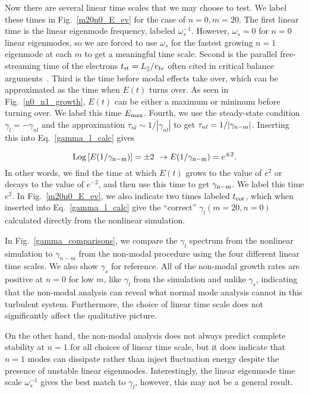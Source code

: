 \documentclass[letter,scriptaddress,twocolumn, prl,showkeys]{revtex4}
\def\beq{\begin{equation}}
\def\eeq{\end{equation}}
\def\para{\parallel}
\begin{document}
Now there are several linear time scales that we may choose to test. We label these times in Fig.~\ref{m20n0_E_ev}
for the case of $n=0, m=20$. The first linear time is the linear eigenmode frequency, labeled
$\omega_s^{-1}$. However, $\omega_s = 0$ for $n=0$ linear eigenmodes, so we are forced to use $\omega_s$ for the fastest growing $n=1$ eigenmode at each $m$ to get a meaningful time scale.
Second is the parallel free-streaming time of the electrons $t_{\rm{st}} = L_\para/v_{t e}$ often cited in critical balance arguments~\cite{barnes2011}. Third is the time before modal effects
take over, which can be approximated as the time when $E(t)$ turns over. As seen in Fig.~\ref{n0_n1_growth}, $E(t)$ can be either a maximum or minimum before turning over. 
We label this time $E_{\rm{max}}$. 
Fourth, we use the steady-state condition $\gamma_l = - \gamma_{nl}$ and the approximation $\tau_{nl} \sim 1/|\gamma_{nl}|$ to get $\tau_{nl} = 1/|\gamma_{\rm{n-m}}|$. 
Inserting this into Eq.~\ref{gamma_l_calc} gives

\beq
\label{fourth_gamma_cond}
 {\rm{Log}} \left[ E(1/\gamma_{\rm{n-m}})\right] = \pm 2 \ \rightarrow E(1/\gamma_{\rm{n-m}}) = e^{\pm 2}.
\eeq
In other words, we find the time at which $E(t)$ grows to the value of $e^2$ or decays to the value of $e^{-2}$, and then use this time to get $\gamma_{\rm{n-m}}$. We label this time $e^2$. 
In Fig.~\ref{m20n0_E_ev},
we also indicate two times labeled $t_{\rm{cor}}$, which when inserted into Eq.~\ref{gamma_l_calc} give the ``correct'' $\gamma_l(m=20,n=0)$ calculated directly from the nonlinear simulation.

In Fig.~\ref{gamma_comparisons}, we compare the $\gamma_{l}$ spectrum from the nonlinear simulation to $\gamma_{n-m}$ from the non-modal procedure using the four different linear time scales. We also show
$\gamma_s$ for reference. All of the non-modal growth rates are positive at $n=0$ for low $m$, like $\gamma_l$ from the simulation and unlike $\gamma_s$, indicating that the non-modal analysis can reveal
what normal mode analysis cannot in this turbulent system. Furthermore, the choice of linear time scale does not significantly affect the qualitative picture. 

On the other hand, the non-modal analysis does not always
predict complete stability at $n=1$ for all choices of linear time scale, but it does indicate that $n=1$ modes can dissipate rather than inject fluctuation energy despite the presence of unstable
linear eigenmodes. Interestingly, the linear eigenmode time scale $\omega_s^{-1}$ gives the best match to $\gamma_l$, however, this may not be a general result.
\end{document}
